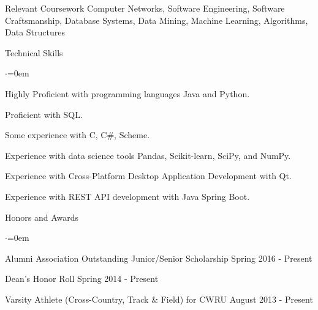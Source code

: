 \documentclass{resume} %
\begin{document}

\begin{rSection}{Relevant Coursework}
Computer Networks, Software Engineering, Software Craftsmanship, Database Systems, Data Mining, Machine Learning, Algorithms, Data Structures
\end{rSection}



\begin{rSection}{Technical Skills}
\begin{list}{$\cdot$}{\leftmargin=0em}
\item Highly Proficient with programming languages Java and Python.
\vspace{-0.5em}
\item Proficient with SQL.
\vspace{-0.5em}
\item Some experience with C, C\#, Scheme.
\vspace{-0.5em}
\item Experience with data science tools Pandas, Scikit-learn, SciPy, and NumPy.
\vspace{-0.5em}
\item Experience with Cross-Platform Desktop Application Development with Qt.
\vspace{-0.5em}
\item Experience with REST API development with Java Spring Boot.
\vspace{-0.5em}
\end{list}
\end{rSection}


\begin{rSection}{Honors and Awards}
\begin{list}{$\cdot$}{\leftmargin=0em}
\item Alumni Association Outstanding Junior/Senior Scholarship \hfill Spring 2016 - Present
\vspace{-0.5em}
\item Dean's Honor Roll \hfill Spring 2014 - Present
\vspace{-0.5em}
\item Varsity Athlete (Cross-Country, Track \& Field) for CWRU \hfill{August 2013 - Present}
\vspace{-0.5em}
\end{list}


\end{rSection}

\end{document}
